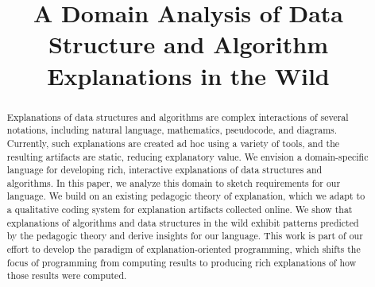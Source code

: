 \documentclass[conference]{IEEEtran}
\begin{document}
\title{A Domain Analysis of Data Structure and Algorithm Explanations in the Wild}



\author{
\IEEEauthorblockA{\phantom{x}\\\phantom{x}\\\phantom{x}}
}

\maketitle


\begin{abstract}
Explanations of data structures and algorithms are complex interactions of
several notations, including natural language, mathematics, pseudocode, and
diagrams. Currently, such explanations are created ad hoc using a variety of
tools, and the resulting artifacts are static, reducing explanatory value. We
envision a domain-specific language for developing rich, interactive
explanations of data structures and algorithms. In this paper, we analyze this
domain to sketch requirements for our language. We build on an existing
pedagogic theory of explanation, which we adapt to a qualitative coding system
for explanation artifacts collected online. We show that explanations of
algorithms and data structures in the wild exhibit patterns predicted by the
pedagogic theory and derive insights for our language. This work is part of our
effort to develop the paradigm of explanation-oriented programming, which
shifts the focus of programming from computing results to producing rich
explanations of how those results were computed.
\end{abstract}


\IEEEpeerreviewmaketitle
\end{document}

